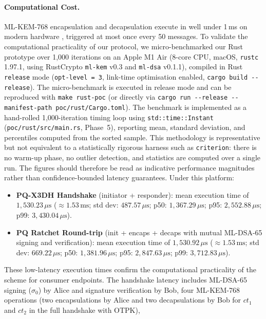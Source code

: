\documentclass[11pt,a4paper]{article}
\theoremstyle{remark}
\theoremstyle{plain}
\begin{document}
\paragraph{Computational Cost.}
ML-KEM-768 encapsulation and decapsulation execute in well under 1\,ms on modern hardware
\cite{nist_fips203}, triggered at most once every 50 messages.
To validate the computational practicality of our protocol, we micro-benchmarked our Rust
prototype over 1{,}000 iterations on an Apple M1 Air (8-core CPU, macOS, \texttt{rustc} 1.97.1,
using RustCrypto \texttt{ml-kem} v0.3 and \texttt{ml-dsa} v0.1.1),
compiled in Rust \texttt{release} mode (\texttt{opt-level = 3}, link-time optimisation enabled,
\texttt{cargo build {-}{-}release}).
The micro-benchmark is executed in release mode and can be reproduced with \texttt{make rust-poc}
(or directly via \texttt{cargo run {-}{-}release {-}{-}manifest-path poc/rust/Cargo.toml}).
The benchmark is implemented as a hand-rolled 1{,}000-iteration
timing loop using \texttt{std::time::Instant} (\texttt{poc/rust/src/main.rs}, Phase~5),
reporting mean, standard deviation, and percentiles computed from the sorted sample.
This methodology is representative but not equivalent to a statistically rigorous harness
such as \texttt{criterion}: there is no warm-up phase, no outlier detection, and statistics
are computed over a single run.  The figures should therefore be read as indicative
performance magnitudes rather than confidence-bounded latency guarantees.  Under this
platform:
\begin{itemize}
  \item \textbf{PQ-X3DH Handshake} (initiator + responder): mean execution time of $1{,}530.23\,\mu\text{s}$ ($\approx 1.53\,\text{ms}$;
        std dev: $487.57\,\mu\text{s}$; p50: $1{,}367.29\,\mu\text{s}$; p95: $2{,}552.88\,\mu\text{s}$; p99: $3{,}430.04\,\mu\text{s}$).
  \item \textbf{PQ Ratchet Round-trip} (init + encaps + decaps with mutual ML-DSA-65 signing and verification): mean execution time of $1{,}530.92\,\mu\text{s}$ ($\approx 1.53\,\text{ms}$;
        std dev: $669.22\,\mu\text{s}$; p50: $1{,}381.96\,\mu\text{s}$; p95: $2{,}847.63\,\mu\text{s}$; p99: $3{,}712.83\,\mu\text{s}$).
\end{itemize}
These low-latency execution times confirm the computational practicality of the scheme for consumer endpoints.
The handshake latency includes ML-DSA-65 signing ($\sigma_0$) by Alice and signature verification by Bob, four ML-KEM-768 operations (two encapsulations by Alice and two decapsulations by Bob for $ct_1$ and $ct_2$ in the full handshake with OTPK),
\end{document}
